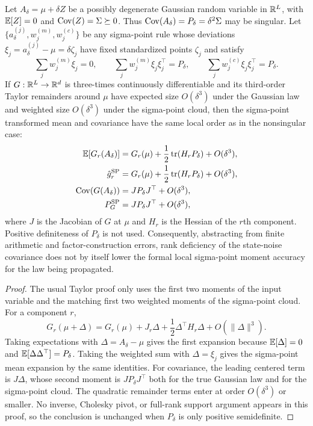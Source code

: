 \begin{proposition}
\label{prop:bf-degenerate-covariance-formal-ut-accuracy}
Let $A_\delta=\mu+\delta Z$ be a possibly degenerate Gaussian random
variable in $\mathbb{R}^L$, with $\mathbb{E}[Z]=0$ and
$\operatorname{Cov}(Z)=\Sigma\succeq0$.  Thus
$\operatorname{Cov}(A_\delta)=P_\delta=\delta^2\Sigma$ may be singular.  Let
$\{a_\delta^{(j)},w_j^{(m)},w_j^{(c)}\}$ be any sigma-point rule whose
deviations $\xi_j=a_\delta^{(j)}-\mu=\delta\zeta_j$ have fixed standardized
points $\zeta_j$ and satisfy
\[
  \sum_j w_j^{(m)}\xi_j=0,\qquad
  \sum_j w_j^{(m)}\xi_j\xi_j^\top=P_\delta,\qquad
  \sum_j w_j^{(c)}\xi_j\xi_j^\top=P_\delta .
\]
If $G:\mathbb{R}^L\to\mathbb{R}^d$ is three-times continuously differentiable and its
third-order Taylor remainders around $\mu$ have expected size $O(\delta^3)$
under the Gaussian law and weighted size $O(\delta^3)$ under the sigma-point
cloud, then the sigma-point transformed mean and covariance have the same local
order as in the nonsingular case:
\begin{align}
  \mathbb{E}[G_r(A_\delta)]
    &=
    G_r(\mu)+\frac{1}{2}\operatorname{tr}(H_rP_\delta)+O(\delta^3),\\
  \hat g_r^{\mathrm{SP}}
    &=
    G_r(\mu)+\frac{1}{2}\operatorname{tr}(H_rP_\delta)+O(\delta^3),\\
  \operatorname{Cov}(G(A_\delta))
    &=
    JP_\delta J^\top+O(\delta^3),\\
  P_G^{\mathrm{SP}}
    &=
    JP_\delta J^\top+O(\delta^3),
\end{align}
where $J$ is the Jacobian of $G$ at $\mu$ and $H_r$ is the Hessian of
the $r$th component.  Positive definiteness of $P_\delta$ is not used.
Consequently, abstracting from finite arithmetic and factor-construction
errors, rank deficiency of the state-noise covariance does not by itself lower
the formal local sigma-point moment accuracy for the law being propagated.
\end{proposition}

\begin{proof}
The usual Taylor proof only uses the first two moments of the input variable
and the matching first two weighted moments of the sigma-point cloud.  For a
component $r$,
\begin{equation}
  G_r(\mu+\Delta)
  =
  G_r(\mu)+J_r\Delta+\frac{1}{2}\Delta^\top H_r\Delta
  +O(\|\Delta\|^3).
\end{equation}
Taking expectations with $\Delta=A_\delta-\mu$ gives the first expansion
because $\mathbb{E}[\Delta]=0$ and $\mathbb{E}[\Delta\Delta^\top]=P_\delta$.  Taking the
weighted sum with $\Delta=\xi_j$ gives the sigma-point mean expansion by the
same identities.  For covariance, the leading centered term is
$J\Delta$, whose second moment is $JP_\delta J^\top$ both for the true
Gaussian law and for the sigma-point cloud.  The quadratic remainder terms
enter at order $O(\delta^3)$ or smaller.  No inverse, Cholesky pivot, or
full-rank support argument appears in this proof, so the conclusion is
unchanged when $P_\delta$ is only positive semidefinite.
\end{proof}

